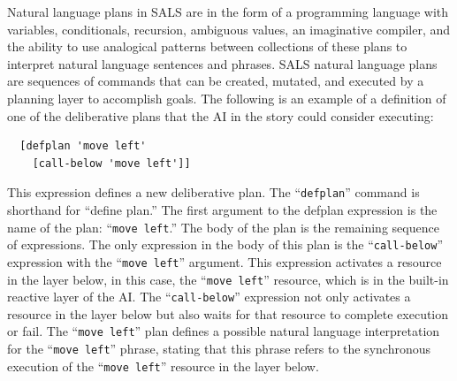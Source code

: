 Natural language plans in SALS are in the form of a programming
language with variables, conditionals, recursion, ambiguous values, an
imaginative compiler, and the ability to use analogical patterns
between collections of these plans to interpret natural language
sentences and phrases.  SALS natural language plans are sequences of
commands that can be created, mutated, and executed by a planning
layer to accomplish goals.  The following is an example of a
definition of one of the deliberative plans that the AI in the story
could consider executing:
\begin{samepage}
\begin{Verbatim}
  [defplan 'move left'
    [call-below 'move left']]
\end{Verbatim}
\end{samepage}
This expression defines a new deliberative plan.  The
``{\tt{defplan}}'' command is shorthand for ``define plan.''  The
first argument to the defplan expression is the name of the plan:
``{\tt{move left}}.''  The body of the plan is the remaining sequence
of expressions.  The only expression in the body of this plan is the
``{\tt{call-below}}'' expression with the ``{\tt{move left}}''
argument.  This expression activates a resource in the layer below, in
this case, the ``{\tt{move left}}'' resource, which is in the built-in
reactive layer of the AI.  The ``{\tt{call-below}}'' expression not
only activates a resource in the layer below but also waits for that
resource to complete execution or fail.  The ``{\tt{move left}}'' plan
defines a possible natural language interpretation for the ``{\tt{move
    left}}'' phrase, stating that this phrase refers to the
synchronous execution of the ``{\tt{move left}}'' resource in the
layer below.

